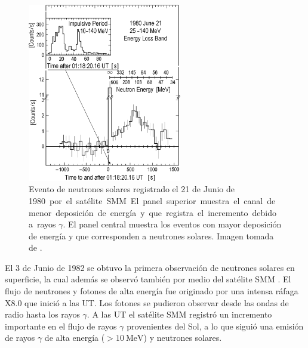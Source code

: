 \begin{figure}
        \centering
        \includegraphics[width=0.6\textwidth]{solar-neutrons.png}
        \caption{Evento de neutrones solares registrado el \num{21} de Junio de \SI{1980} por el satélite SMM. El panel superior muestra el canal de menor deposición de energía y que registra el incremento debido a rayos $\gamma$. El panel central muestra los eventos con mayor deposición de energía y que corresponden a neutrones solares. Imagen tomada de \cite{chupp82}.}
        \label{fig:solar-neutrons}
\end{figure}

El \num{3} de Junio de \num{1982} se obtuvo la primera observación de neutrones solares en superficie, la cual además se observó también por medio del satélite SMM \cite{debrunner83}. El flujo de neutrones y fotones de alta energía fue originado por una intensa ráfaga X\num{8.0} que inició a las  UT. Los fotones se pudieron observar desde las ondas de radio hasta los rayos $\gamma$. A las  UT el satélite SMM registró un incremento importante en el flujo de rayos $\gamma$ provenientes del Sol, a lo que siguió una emisión de rayos $\gamma$ de alta energía ($>\SI{10}{\mega\electronvolt}$) y neutrones solares.

